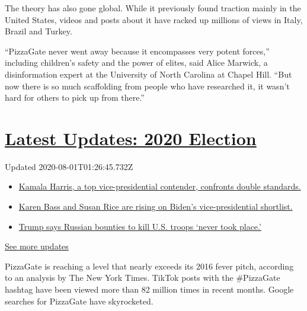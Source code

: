 The theory has also gone global. While it previously found traction
mainly in the United States, videos and posts about it have racked up
millions of views in Italy, Brazil and Turkey.

``PizzaGate never went away because it encompasses very potent forces,''
including children's safety and the power of elites, said Alice Marwick,
a disinformation expert at the University of North Carolina at Chapel
Hill. ``But now there is so much scaffolding from people who have
researched it, it wasn't hard for others to pick up from there.''

\hypertarget{latest-updates-2020-election}{%
\section{\texorpdfstring{\href{https://www.nytimes.com/2020/07/31/us/elections/biden-vs-trump.html?action=click\&pgtype=Article\&state=default\&region=MAIN_CONTENT_1\&context=storylines_live_updates}{Latest
Updates: 2020
Election}}{Latest Updates: 2020 Election}}\label{latest-updates-2020-election}}

Updated 2020-08-01T01:26:45.732Z

\begin{itemize}
\tightlist
\item
  \href{https://www.nytimes.com/2020/07/31/us/elections/biden-vs-trump.html?action=click\&pgtype=Article\&state=default\&region=MAIN_CONTENT_1\&context=storylines_live_updates\#link-29fdff45}{Kamala
  Harris, a top vice-presidential contender, confronts double
  standards.}
\item
  \href{https://www.nytimes.com/2020/07/31/us/elections/biden-vs-trump.html?action=click\&pgtype=Article\&state=default\&region=MAIN_CONTENT_1\&context=storylines_live_updates\#link-13ec3d9c}{Karen
  Bass and Susan Rice are rising on Biden's vice-presidential
  shortlist.}
\item
  \href{https://www.nytimes.com/2020/07/31/us/elections/biden-vs-trump.html?action=click\&pgtype=Article\&state=default\&region=MAIN_CONTENT_1\&context=storylines_live_updates\#link-49e9a016}{Trump
  says Russian bounties to kill U.S. troops `never took place.'}
\end{itemize}

\href{https://www.nytimes.com/2020/07/31/us/elections/biden-vs-trump.html?action=click\&pgtype=Article\&state=default\&region=MAIN_CONTENT_1\&context=storylines_live_updates}{See
more updates}

PizzaGate is reaching a level that nearly exceeds its 2016 fever pitch,
according to an analysis by The New York Times. TikTok posts with the
\#PizzaGate hashtag have been viewed more than 82 million times in
recent months. Google searches for PizzaGate have skyrocketed.

